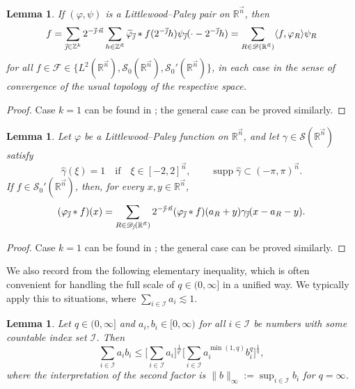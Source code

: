 \documentclass[11pt, reqno]{amsart}
\newtheorem{lemma}[theorem]{Lemma}
\theoremstyle{definition}
\theoremstyle{remark}
\numberwithin{equation}{section}
\newcommand{\D}{\mathscr D}
\newcommand{\Fs}{\mathscr F}
\newcommand{\R}{\mathbb R}
\newcommand{\Sc}{\mathscr S}
\newcommand{\Z}{\mathbb Z}
\newcommand{\vj}{\vec{\textit{\j}}}
\newcommand{\vn}{\vec n}
\newcommand{\supp}{\operatorname{supp}}
\newcommand{\pair}[2]{\langle #1, #2 \rangle}
\begin{document}
\begin{lemma}\label{cald2}
If $(\varphi,\psi)$ is a Littlewood--Paley pair on $\R^{\vn}$, then
\begin{equation}\label{cald20}
f=\sum_{\vj\in\Z^k}2^{-\vj\cdot\vn}\sum_{h\in\Z^{\vn}}
\widetilde\varphi_{\vj}*f(2^{-\vj}h)\psi_{\vj}(\cdot-2^{-\vj}h)
=\sum_{R\in\D(\R^{\vn})}\pair{f}{\varphi_R}\psi_R
\end{equation}
for all $f\in\Fs\in\{L^2(\R^{\vn}),\Sc_0(\R^{\vn}),\Sc_0'(\R^{\vn})\}$, in each case in the sense of convergence of the usual topology of the respective space.
\end{lemma}

\begin{proof}
Case $k=1$ can be found in \cite[Lemma 2.1]{YY10}; the general case can be proved similarly.
\end{proof}

\begin{lemma}\label{cald3}
Let $\varphi$ be a Littlewood--Paley function on $\R^{\vn}$, and let $\gamma\in\Sc(\R^{\vn})$ satisfy
\begin{equation*}
\widehat\gamma(\xi)=1\quad\text{if}\quad\xi\in [-2,2]^{\vn},\qquad
\supp\widehat\gamma\subset (-\pi,\pi)^{\vn}.
\end{equation*}
If $f\in\Sc_0'(\R^{\vn})$, then,
for every $x,y\in\mathbb R^{\vn}$,
\begin{equation}\label{cald30}
(\varphi_{\vj}*f)(x)=\sum_{R\in\D_{\vj}(\R^{\vn})}2^{-\vj\cdot\vn}(\varphi_{\vj}*f)(a_R+y)\gamma_{\vj}(x-a_R-y).
\end{equation}
\end{lemma}

\begin{proof}
Case $k=1$ can be found in \cite[Remark 3.16]{BHYY:1a};
the general case can be proved similarly.
\end{proof}

We also record from \cite[Lemma 3.7]{BHYY:1a} the following elementary inequality,
which is often convenient for handling the full scale of $q\in(0,\infty]$ in a unified way.
We typically apply this to situations, where $\sum_{i\in\mathscr I}a_i\lesssim 1$.

\begin{lemma}\label{one fits all}
Let $q\in(0,\infty]$ and $a_i,b_i\in[0,\infty)$ for all $i\in\mathscr I$
be numbers with some countable index set $\mathscr I$. Then
\begin{equation*}
\sum_{i\in\mathscr I}a_ib_i
\leq\Bigg[\sum_{i\in\mathscr I}a_i\Bigg]^{\frac{1}{q'}}
\Bigg[\sum_{i\in\mathscr I}a_i^{\min(1,q)}b_i^q\Bigg]^{\frac1q},
\end{equation*}
where the interpretation of the second factor is $\|b\|_\infty:=\sup_{i\in\mathscr I}b_i$ for $q=\infty$.
\end{lemma}
\end{document}
